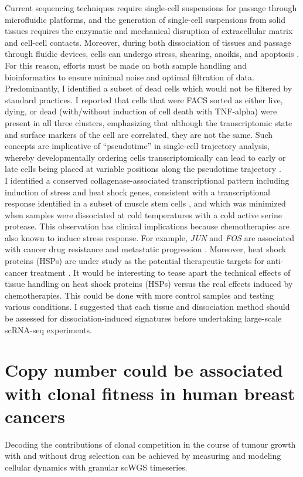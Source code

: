    
Current sequencing techniques require single-cell suspensions for passage through microfluidic platforms, and the generation of single-cell suspensions from solid tissues requires the enzymatic and mechanical disruption of extracellular matrix and cell-cell contacts. Moreover, during both dissociation of tissues and passage through fluidic devices, cells can undergo stress, shearing, anoikis, and apoptosis \cite{aljanahi2018introduction}. For this reason, efforts must be made on both sample handling and bioinformatics to ensure minimal noise and optimal filtration of data.
\\
Predominantly, I identified a subset of dead cells which would not be filtered by standard practices. I reported that cells that were FACS sorted as either live, dying, or dead (with/without induction of cell death with TNF-alpha) were present in all three clusters, emphasizing that although the transcriptomic state and surface markers of the cell are correlated, they are not the same. Such concepts are implicative  of ``pseudotime'' in single-cell trajectory analysis, whereby developmentally ordering cells transcriptomically can lead to early or late cells being placed at variable positions along the pseudotime trajectory \cite{campbell2018descriptive, campbell2018uncovering}. 
 \\
 I identified a conserved collagenase-associated transcriptional pattern including induction of stress and heat shock genes, consistent with a transcriptional response identified in a subset of muscle stem cells \cite{van2017single}, and which was minimized when samples were dissociated at cold temperatures with a cold active serine protease. This observation has clinical implications because chemotherapies are also known to induce stress response. For example, \textit{JUN} and \textit{FOS} are associated with cancer drug resistance and metastatic progression \cite{insua2018stress,fan2017ap, ramsdale2015transcription}. Moreover, heat shock proteins (HSPs) are under study as the potential therapeutic targets for anti-cancer treatment \cite{yun2020heat}.
 It would be interesting to tease apart the technical effects of tissue handling on heat shock proteins (HSPs) versus the real effects induced by chemotherapies. This could be done with more control samples and testing various conditions.
I suggested that each tissue and dissociation method should be assessed for dissociation-induced signatures before undertaking large-scale scRNA-seq experiments. 
 

\section{Copy number could be associated with clonal fitness in human breast cancers}
Decoding the contributions of clonal competition in the course of tumour growth with and without drug selection can be achieved by measuring and modeling cellular dynamics with granular scWGS timeseries.

